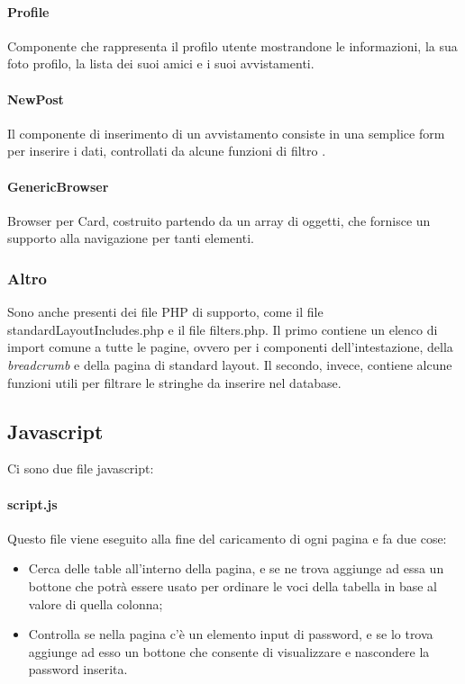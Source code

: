 \documentclass[12pt, a4paper]{article}
\begin{document}
    \paragraph{Profile}
    Componente che rappresenta il profilo utente mostrandone le informazioni, la sua foto profilo, la lista dei suoi amici e i suoi avvistamenti.

    \paragraph{NewPost}
    Il componente di inserimento di un avvistamento consiste in una semplice form per inserire i dati, controllati da alcune funzioni di filtro .

    \paragraph{GenericBrowser}
    Browser per Card, costruito partendo da un array di oggetti, che
    fornisce un supporto alla navigazione per tanti elementi.

    \subsubsection{Altro}
    Sono anche presenti dei file PHP di supporto, come il file standardLayoutIncludes.php e il file filters.php. Il primo contiene un elenco di import comune a tutte le pagine, ovvero per i componenti dell'intestazione, della \textit{breadcrumb} e della pagina di standard layout. Il secondo, invece, contiene alcune funzioni utili per filtrare le stringhe da inserire nel database.

    \subsection{Javascript}
    Ci sono due file javascript:

    \paragraph{script.js} Questo file viene eseguito alla fine del caricamento di ogni pagina e fa due cose:
    \begin{itemize}
        \item Cerca delle table all'interno della pagina, e se ne trova aggiunge ad essa un bottone che potrà essere usato per ordinare le voci della tabella in base al valore di quella colonna;
        \item Controlla se nella pagina c'è un elemento input di password, e se lo trova aggiunge ad esso un bottone che consente di visualizzare e nascondere la password inserita.
    \end{itemize}
\end{document}

